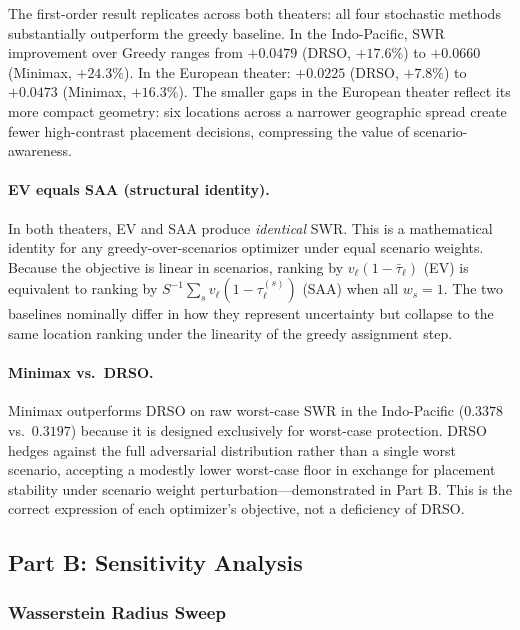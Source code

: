 \documentclass[11pt]{article}
\begin{document}
The first-order result replicates across both theaters: all four
stochastic methods substantially outperform the greedy baseline.
In the Indo-Pacific, SWR improvement over Greedy ranges from
$+0.0479$ (DRSO, $+17.6\%$) to $+0.0660$ (Minimax, $+24.3\%$).
In the European theater: $+0.0225$ (DRSO, $+7.8\%$) to
$+0.0473$ (Minimax, $+16.3\%$).
The smaller gaps in the European theater reflect its more compact
geometry: six locations across a narrower geographic spread create
fewer high-contrast placement decisions, compressing the value of
scenario-awareness.

\paragraph{EV equals SAA (structural identity).}
In both theaters, EV and SAA produce \emph{identical} SWR.
This is a mathematical identity for any greedy-over-scenarios
optimizer under equal scenario weights.  Because the objective is
linear in scenarios, ranking by
$v_\ell(1 - \bar{\tau}_\ell)$ (EV) is equivalent to ranking by
$S^{-1}\!\sum_s v_\ell(1 - \tau_\ell^{(s)})$ (SAA) when all
$w_s = 1$.  The two baselines nominally differ in how they represent
uncertainty but collapse to the same location ranking under the
linearity of the greedy assignment step.

\paragraph{Minimax vs.\ DRSO.}
Minimax outperforms DRSO on raw worst-case SWR in the Indo-Pacific
($0.3378$ vs.\ $0.3197$) because it is designed exclusively for
worst-case protection.  DRSO hedges against the full adversarial
distribution rather than a single worst scenario, accepting a modestly
lower worst-case floor in exchange for placement stability under
scenario weight perturbation---demonstrated in Part B.
This is the correct expression of each optimizer's objective, not a
deficiency of DRSO.

\subsection{Part B: Sensitivity Analysis}
\label{sec:exp5:partb}

\subsubsection{Wasserstein Radius Sweep}
\end{document}
